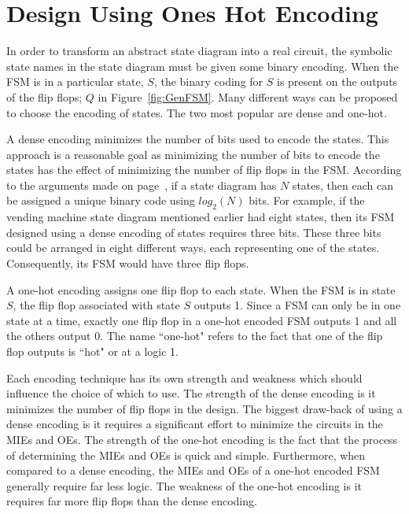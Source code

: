 
\section{Design Using Ones Hot Encoding}

In order to transform an abstract state diagram into a real circuit, the 
symbolic state names in the state diagram must be given some binary encoding.  
When the FSM is in a particular state, $S$, the binary coding for $S$ 
is present on the outputs of the flip flops; $Q$ in Figure~\ref{fig:GenFSM}.
Many different ways can be proposed to choose the encoding of states.  The two most 
popular are dense and one-hot.

A dense encoding minimizes the number of bits used to encode the 
states.  This approach 
is a reasonable goal as minimizing the number of bits to encode the states
has the effect of minimizing the number of flip flops in the FSM.  According to
the arguments made on page~\pageref{page:two-to-N}, if a state diagram has $N$ 
states, then each can be assigned a unique binary code using $log_2(N)$ bits.  
For example, if the vending machine state diagram mentioned earlier had eight  
states, then its FSM designed using a dense encoding of states requires 
three bits.  These three bits could be arranged in eight different ways, each representing
one of the states.  Consequently, its FSM would have three flip flops.

A one-hot encoding assigns one flip flop to each state.  When the FSM is in
state $S$, the flip flop associated with state $S$ outputs 1. Since a FSM can
only be in one state at a time, exactly one flip flop in a one-hot encoded FSM 
outputs 1 and all the others output 0.  The name ``one-hot" refers to the 
fact that one of the flip flop outputs is ``hot" or at a logic 1.

Each encoding technique has its own strength and weakness which should 
influence the choice of which to use.  The strength of the dense encoding 
is it minimizes the number of flip flops in the design.  The biggest 
draw-back of using a dense
encoding is it requires a significant effort to minimize the circuits
in the MIEs and OEs. The strength of the one-hot encoding is the fact that
the process of determining the MIEs and OEs is quick and simple.  Furthermore, 
when compared to a dense encoding, the MIEs and OEs of a one-hot encoded FSM
generally require far less logic.
The weakness of the one-hot encoding is it requires far more flip flops
than the dense encoding.

